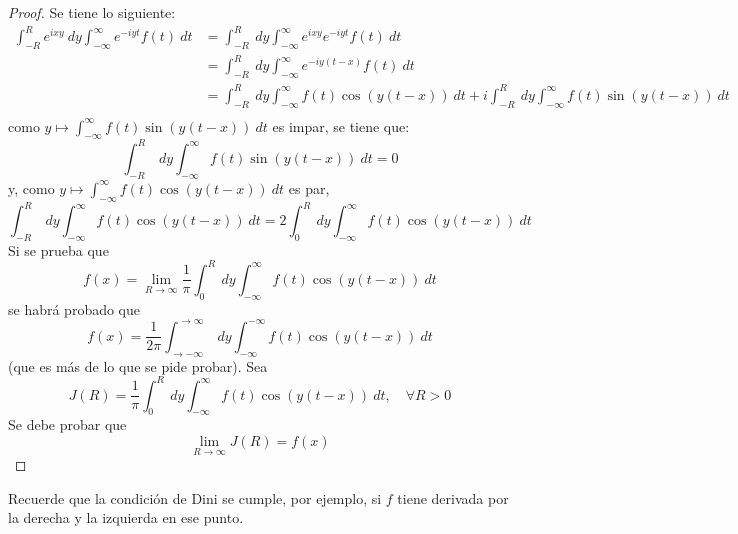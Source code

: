 \documentclass[12pt]{report}
\theoremstyle{largebreak}
\begin{document}
    \begin{proof}
        Se tiene lo siguiente:
        \begin{equation*}
            \begin{split}
                \int_{ -R}^{ R}e^{ixy}\:dy\int_{-\infty}^\infty e^{ -iyt}f(t)\:dt&=\int_{ -R}^{ R}\:dy\int_{-\infty}^\infty e^{ixy}e^{ -iyt}f(t)\:dt\\
                &=\int_{ -R}^{ R}\:dy\int_{-\infty}^\infty e^{ -iy(t-x)}f(t)\:dt\\
                &=\int_{ -R}^{ R}\:dy\int_{-\infty}^\infty f(t)\cos(y(t-x))\:dt+i\int_{ -R}^{ R}\:dy\int_{-\infty}^\infty f(t)\sin(y(t-x))\:dt\\
            \end{split}
        \end{equation*}
        como $y\mapsto\int_{-\infty}^\infty f(t)\sin(y(t-x))\:dt$ es impar, se tiene que:
        \begin{equation*}
            \int_{ -R}^{ R}\:dy\int_{-\infty}^\infty f(t)\sin(y(t-x))\:dt=0
        \end{equation*}
        y, como $y\mapsto\int_{-\infty}^\infty f(t)\cos(y(t-x))\:dt$ es par,
        \begin{equation*}
            \int_{ -R}^{ R}\:dy\int_{-\infty}^\infty f(t)\cos(y(t-x))\:dt=2\int_{0}^{ R}\:dy\int_{-\infty}^\infty f(t)\cos(y(t-x))\:dt
        \end{equation*}
        Si se prueba que
        \begin{equation*}
            f(x)=\lim_{ R\rightarrow\infty}\frac{1}{\pi}\int_{0}^{ R}\:dy\int_{-\infty}^\infty f(t)\cos(y(t-x))\:dt
        \end{equation*}
        se habrá probado que
        \begin{equation*}
            f(x)=\frac{1}{2\pi}\int_{ \rightarrow-\infty}^{\rightarrow\infty}\:dy\int_{ -\infty}^{ -\infty}f(t)\cos(y(t-x))\:dt
        \end{equation*}
        (que es más de lo que se pide probar). Sea
        \begin{equation*}
            J(R)=\frac{1}{\pi}\int_0^R\:dy\int_{-\infty}^\infty f(t)\cos(y(t-x))\:dt,\quad\forall R>0
        \end{equation*}
        Se debe probar que
        \begin{equation*}
            \lim_{ R\rightarrow\infty}J(R)=f(x)
        \end{equation*}
    \end{proof}

    \begin{obs}
        Recuerde que la condición de Dini se cumple, por ejemplo, si $f$ tiene derivada por la derecha y la izquierda en ese punto.
    \end{obs}
\end{document}

